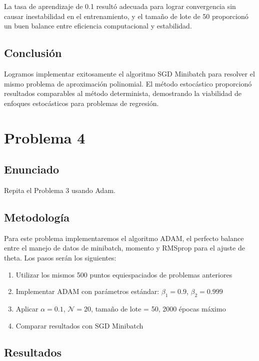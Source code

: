 \documentclass{article}
\begin{document}
La tasa de aprendizaje de 0.1 resultó adecuada para lograr convergencia sin causar inestabilidad en el entrenamiento, y el tamaño de lote de 50 proporcionó un buen balance entre eficiencia computacional y estabilidad.

\subsection{Conclusión}

Logramos implementar exitosamente el algoritmo SGD Minibatch para resolver el mismo problema de aproximación polinomial. El método estocástico proporcionó resultados comparables al método determinista, demostrando la viabilidad de enfoques estocásticos para problemas de regresión.

\section{Problema 4}

\subsection{Enunciado}

Repita el Problema 3 usando Adam.

\subsection{Metodología}

Para este problema implementaremos el algoritmo ADAM, el perfecto balance entre el manejo de datos de minibatch, momento y RMSprop para el ajuste de theta. Los pasos serán los siguientes:

\begin{enumerate}
    \item Utilizar los mismos 500 puntos equiespaciados de problemas anteriores
    \item Implementar ADAM con parámetros estándar: $\beta_1 = 0.9$, $\beta_2 = 0.999$
    \item Aplicar $\alpha = 0.1$, $\mathcal{N} = 20$, tamaño de lote = 50, 2000 épocas máximo
    \item Comparar resultados con SGD Minibatch
\end{enumerate}

\subsection{Resultados}
\setcounter{equation}{0}
\end{document}
